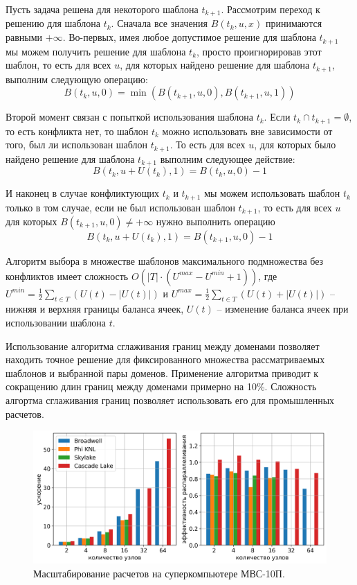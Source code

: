 \documentclass[a4paper,14pt]{extarticle}                     %
\theoremstyle{plain}                                         %
\begin{document}
Пусть задача решена для некоторого шаблона $t_{k + 1}$.
Рассмотрим переход к решению для шаблона $t_k$.
Сначала все значения $B(t_k, u, x)$ принимаются равными $+\infty$.
Во-первых, имея любое допустимое решение для шаблона $t_{k + 1}$ мы можем получить решение для шаблона $t_k$, просто проигнорировав этот шаблон, то есть для всех $u$, для которых найдено решение для шаблона $t_{k + 1}$, выполним следующую операцию:
\begin{equation*}
	B(t_k, u, 0) = \min \left( B(t_{k + 1}, u, 0), B(t_{k + 1}, u, 1) \right)
\end{equation*}

Второй момент связан с попыткой использования шаблона $t_k$.
Если $t_k \cap t_{k + 1} = \emptyset$, то есть конфликта нет, то шаблон $t_k$ можно использовать вне зависимости от того, был ли использован шаблон $t_{k + 1}$.
То есть для всех $u$, для которых было найдено решение для шаблона $t_{k + 1}$ выполним следующее действие:
\begin{equation*}
	B(t_k, u + U(t_k), 1) = B(t_k, u, 0) - 1
\end{equation*}

И наконец в случае конфликтующих $t_k$ и $t_{k + 1}$ мы можем использовать шаблон $t_k$ только в том случае, если не был использован шаблон $t_{k + 1}$, то есть для всех $u$ для которых $B(t_{k + 1}, u, 0) \ne +\infty$ нужно выполнить операцию
\begin{equation*}
	B(t_k, u + U(t_k), 1) = B(t_{k + 1}, u, 0) - 1
\end{equation*}

Алгоритм выбора в множестве шаблонов максимального подмножества без конфликтов имеет сложность $O \left( |T| \cdot (U^{max} - U^{min} + 1) \right)$, где $U^{min} = \frac{1}{2} \sum_{t \in T}{(U(t) - |U(t)|)}$ и $U^{max} = \frac{1}{2} \sum_{t \in T}{(U(t) + |U(t)|)}$ -- нижняя и верхняя границы баланса ячеек, $U(t)$ -- изменение баланса ячеек при использовании шаблона $t$.

Использование алгоритма сглаживания границ между доменами позволяет находить точное решение для фиксированного множества рассматриваемых шаблонов и выбранной пары доменов.
Применение алгоритма приводит к сокращению длин границ между доменами примерно на 10\%.
Сложность алгортма сглаживания границ позволяет использовать его для промышленных расчетов.

\begin{figure}[!ht]
\centering
\includegraphics[width=1.0\textwidth]{fig/par_surf_2in1_big.png}
\singlespacing
\caption{Масштабирование расчетов на суперкомпьютере МВС-10П.}
\label{fig:text_2_scaling_speedup_eff}
\end{figure}
\end{document}
